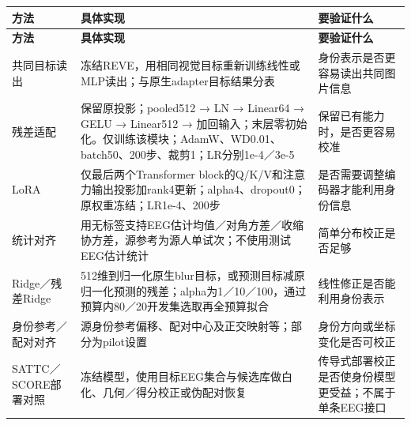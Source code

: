 \documentclass[UTF8,a4paper,11pt,fontset=none]{ctexart}
\begin{document}
{\small
\begin{longtable}{>{\raggedright\arraybackslash}p{3.311cm}>{\raggedright\arraybackslash}p{6.623cm}>{\raggedright\arraybackslash}p{6.623cm}}
\toprule
\textbf{方法} & \textbf{具体实现} & \textbf{要验证什么} \\
\midrule\endfirsthead
\textbf{方法} & \textbf{具体实现} & \textbf{要验证什么} \\
\midrule\endhead
\bottomrule\endfoot
共同目标读出 & 冻结REVE，用相同视觉目标重新训练线性或MLP读出；与原生adapter目标结果分表 & 身份表示是否更容易读出共同图片信息 \\
残差适配 & 保留原投影；pooled512 → LN → Linear64 → GELU → Linear512 → 加回输入；末层零初始化。仅训练该模块；AdamW、WD0.01、batch50、200步、裁剪1；LR分别1e-4／3e-5 & 保留已有能力时，是否更容易校准 \\
LoRA & 仅最后两个Transformer block的Q/K/V和注意力输出投影加rank4更新；alpha4、dropout0；原权重冻结；LR1e-4、200步 & 是否需要调整编码器才能利用身份信息 \\
统计对齐 & 用无标签支持EEG估计均值／对角方差／收缩协方差，源参考为源人单试次；不使用测试EEG估计统计 & 简单分布校正是否足够 \\
Ridge／残差Ridge & 512维到归一化原生blur目标，或预测目标减原归一化预测的残差；alpha为1／10／100，通过预算内80／20开发集选取再全预算拟合 & 线性修正是否能利用身份表示 \\
身份参考／配对对齐 & 源身份参考偏移、配对中心及正交映射等；部分为pilot设置 & 身份方向或坐标变化是否可校正 \\
SATTC／SCORE部署对照 & 冻结模型，使用目标EEG集合与候选库做白化、几何／得分校正或伪配对恢复 & 传导式部署校正是否使身份模型更受益；不属于单条EEG接口 \\
\end{longtable}
}
\end{document}
